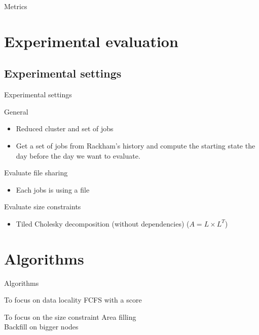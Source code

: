 \documentclass{libs/ufc_format}
\begin{document}
{\begin{frame}{Metrics}
\end{frame}


\section{Experimental evaluation}
\subsection{Experimental settings}
\begin{frame}{Experimental settings}
        \begin{block}{General}
            \begin{itemize}
				\item Reduced cluster and set of jobs
				\item Get a set of jobs from Rackham's history and compute the starting state the day before the day we want to evaluate.
			\end{itemize}
        \end{block}
        \begin{block}{Evaluate file sharing}
            \begin{itemize}
				\item Each jobs is using a file
			\end{itemize}
		\end{block}
			\begin{block}{Evaluate size constraints}
			\begin{itemize}
				\item Tiled Cholesky decomposition (without dependencies) ($A = L \times L^T$)
			\end{itemize}
			\end{block}
\end{frame}

\section{Algorithms}

\begin{frame}{Algorithms}
\begin{block}{To focus on data locality}
FCFS with a score
\end{block}
\begin{block}{To focus on the size constraint}
Area filling\\
Backfill on bigger nodes
\end{block}
\end{frame}

}
\end{document}
